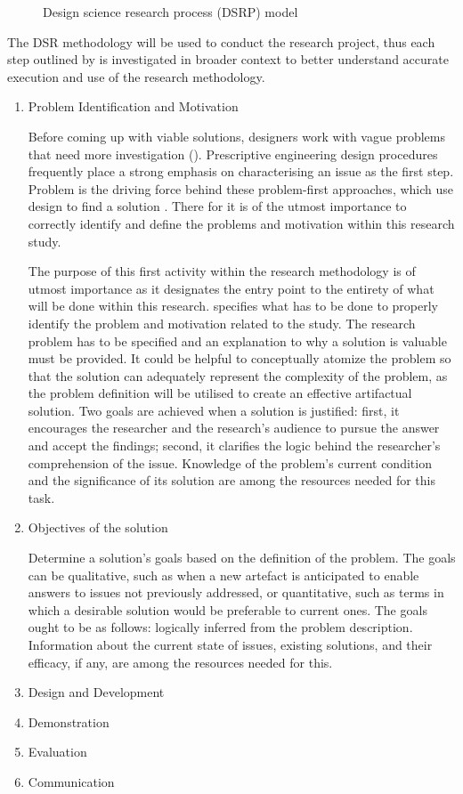 {{\begin{figure}[h!]
    \caption{Design science research process (DSRP) model}
    \label{fig:enter-label}
\end{figure}
\par{The DSR methodology will be used to conduct the research project, thus each step outlined by \cite{peffers2007design} is investigated in broader context to better understand accurate execution and use of the research methodology.}
\par{\begin{enumerate}
        \item Problem Identification and Motivation
\par{Before coming up with viable solutions, designers work with vague problems that need more investigation (\citealt{buchanan1992wicked, rittel1973dilemmas}). Prescriptive engineering design procedures frequently place a strong emphasis on characterising an issue as the first step. Problem  is the driving force behind these problem-first approaches, which use design to find a solution \citep{dewey2022we}. There for it is of the utmost importance to correctly identify and define the problems and motivation within this research study.}
\par{The purpose of this first activity within the research methodology is of utmost importance as it designates the entry point to the entirety of what will be done within this research. \cite{peffers2007design} specifies what has to be done to properly identify the problem and motivation related to the study. The research problem has to be specified and an explanation to why a solution is valuable must be provided. It could be helpful to conceptually atomize the problem so that the solution can adequately represent the complexity of the problem, as the problem definition will be utilised to create an effective artifactual solution. Two goals are achieved when a solution is justified: first, it encourages the researcher and the research's audience to pursue the answer and accept the findings; second, it clarifies the logic behind the researcher's comprehension of the issue. Knowledge of the problem's current condition and the significance of its solution are among the resources needed for this task.}
        \item Objectives of the solution
\par{Determine a solution's goals based on the definition of the problem. The goals can be qualitative, such as when a new artefact is anticipated to enable answers to issues not previously addressed, or quantitative, such as terms in which a desirable solution would be preferable to current ones. The goals ought to be as follows: logically inferred from the problem description. Information about the current state of issues, existing solutions, and their efficacy, if any, are among the resources needed for this.}
        \item Design and Development
\par{}
        \item Demonstration
        \item Evaluation
        \item Communication
\end{enumerate}}
}}
